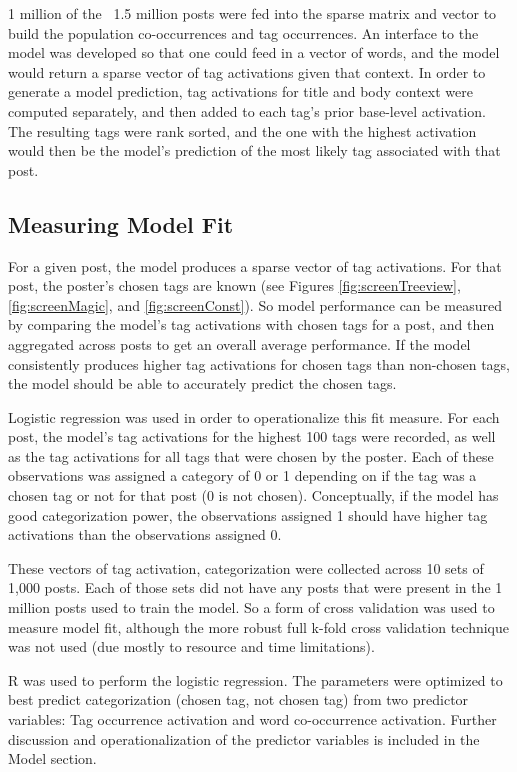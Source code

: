 \documentclass[10pt,letterpaper]{article}
\begin{document}
1 million of the ~1.5 million posts were fed into the sparse matrix and vector to build the population co-occurrences and tag occurrences.
An interface to the model was developed so that one could feed in a vector of words, and the model would return a sparse vector of tag activations given that context.
In order to generate a model prediction, tag activations for title and body context were computed separately, and then added to each tag's prior base-level activation.
The resulting tags were rank sorted, and the one with the highest activation would then be the model's prediction of the most likely tag associated with that post.

\subsection{Measuring Model Fit}

For a given post, the model produces a sparse vector of tag activations.
For that post, the poster's chosen tags are known (see Figures \ref{fig:screenTreeview}, \ref{fig:screenMagic}, and \ref{fig:screenConst}).
So model performance can be measured by comparing the model's tag activations with chosen tags for a post, and then aggregated across posts to get an overall average performance.
If the model consistently produces higher tag activations for chosen tags than non-chosen tags, the model should be able to accurately predict the chosen tags.

Logistic regression was used in order to operationalize this fit measure.
For each post, the model's tag activations for the highest 100 tags were recorded, as well as the tag activations for all tags that were chosen by the poster.
Each of these observations was assigned a category of 0 or 1 depending on if the tag was a chosen tag or not for that post (0 is not chosen).
Conceptually, if the model has good categorization power, the observations assigned 1 should have higher tag activations than the observations assigned 0.

These vectors of tag activation, categorization were collected across 10 sets of 1,000 posts.
Each of those sets did not have any posts that were present in the 1 million posts used to train the model.
So a form of cross validation was used to measure model fit, although the more robust full k-fold cross validation technique was not used (due mostly to resource and time limitations).

R was used to perform the logistic regression.
The parameters were optimized to best predict categorization (chosen tag, not chosen tag) from two predictor variables: Tag occurrence activation and word co-occurrence activation.
Further discussion and operationalization of the predictor variables is included in the Model section.
\end{document}
